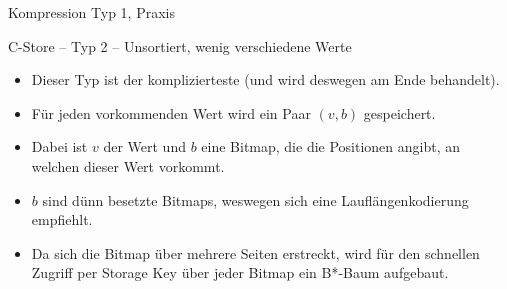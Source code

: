 \begin{frame}{Kompression Typ 1, Praxis}


\end{frame}

\begin{frame}{C-Store -- Typ 2 -- Unsortiert, wenig verschiedene Werte}
\begin{itemize}[<+->]
	\item Dieser Typ ist der komplizierteste (und wird deswegen am Ende behandelt).
	\item F\"ur jeden vorkommenden Wert wird ein Paar $(v,b)$ gespeichert.
	\item Dabei ist $v$ der Wert und $b$ eine Bitmap, die die Positionen angibt, an welchen dieser Wert vorkommt.
	\item $b$ sind d\"unn besetzte Bitmaps, weswegen sich eine Laufl\"angenkodierung empfiehlt.
	\item Da sich die Bitmap über mehrere Seiten erstreckt, wird für den schnellen Zugriff per Storage Key über jeder Bitmap ein B*-Baum aufgebaut.
\end{itemize}
\end{frame}

